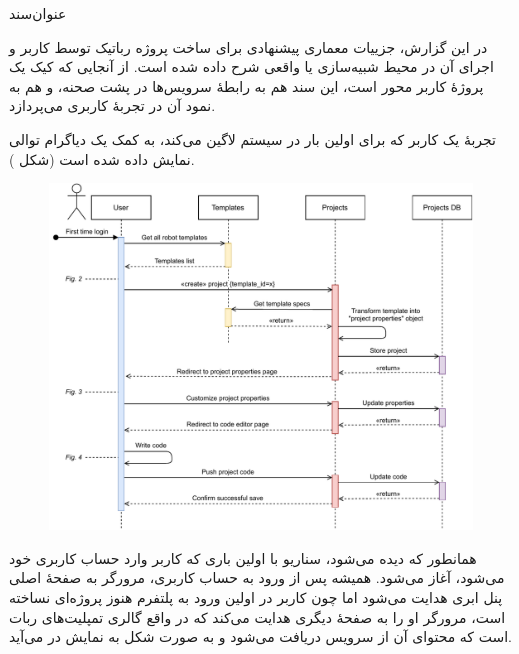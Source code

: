 \documentclass{cake-classes/short-report-fa}
\newcommand{\ورب}[1]{\lr{\Verb!#1!}}
\begin{document}
‌عنوان‌سند

\listoffigures

در این گزارش، جزییات معماری پیشنهادی برای ساخت پروژه رباتیک توسط کاربر و اجرای آن در محیط شبیه‌سازی یا واقعی شرح داده شده است. از آنجایی که کیک یک پروژهٔ کاربر محور است، این سند هم به رابطهٔ سرویس‌ها در پشت صحنه، و هم به نمود آن در تجربهٔ کاربری می‌پردازد.


تجربهٔ یک کاربر که برای اولین بار در سیستم لاگین می‌کند، به کمک یک دیاگرام توالی نمایش داده شده است (شکل ).

\begin{figure}
	\centering
	\includegraphics[width=\linewidth]{img/seq-create-project.pdf}
\end{figure}

\clearpage

همانطور که دیده می‌شود، سناریو با اولین باری که کاربر وارد حساب کاربری خود می‌شود، آغاز می‌شود. همیشه پس از ورود به حساب کاربری، مرورگر به صفحهٔ اصلی پنل ابری هدایت می‌شود اما چون کاربر در اولین ورود به پلتفرم هنوز پروژه‌ای نساخته است، مرورگر او را به صفحهٔ دیگری هدایت می‌کند که در واقع گالری تمپلیت‌های ربات است که محتوای آن از سرویس  دریافت می‌شود و به صورت شکل  به نمایش در می‌آید.
\end{document}
